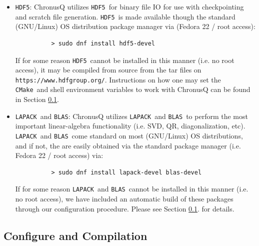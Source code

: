 \documentclass[12pt]{article}
\newcommand{\CMake}{\texttt{CMake}}
\newcommand{\HDF}{\texttt{HDF5}}
\newcommand{\LAPACK}{\texttt{LAPACK}}
\newcommand{\BLAS}{\texttt{BLAS}}
\newcommand{\Python}{\texttt{Python}}
\begin{document}
\begin{itemize}
	\begin{lstlisting}
          > sudo dnf install python-devel libxml2-devel libxslt-devel
	\end{lstlisting}
        To parse the input file, ChrounusQ relies on the \Python~module 
	\texttt{ConfigParser}. One may obtain \texttt{ConfigParser} through
	the \Python~\texttt{pip} module via:
	 
	\begin{lstlisting}
	  > pip install configparser
	\end{lstlisting}

      \item \HDF: ChronusQ utilizes \HDF~for binary file IO for use with 
        checkpointing and scratch file generation. \HDF~is made available
	though the standard (GNU/Linux) OS distribution package manager via
	(Fedora 22 / root access):

	\begin{lstlisting}
          > sudo dnf install hdf5-devel
	\end{lstlisting}
	If for some reason \HDF~cannot be installed in this manner (i.e. no
	root access), it may be compiled from source from the tar files on
	\texttt{https://www.hdfgroup.org/}. Instructions on how one may set
	the \CMake~and shell environment variables to work with ChronusQ
	can be found in Section \ref{subsec:ChronusQConfigCompile}.

      \item \LAPACK~and \BLAS: ChronusQ utilizes \LAPACK~and \BLAS~to perform
        the most important linear-algebra functionality (i.e. SVD, QR, 
	diagonalization, etc). \LAPACK~and \BLAS~come standard on most
	(GNU/Linux) OS distributions, and if not, the are easily obtained via
	the standard package manager (i.e. Fedora 22 / root access) via:

	\begin{lstlisting}
          > sudo dnf install lapack-devel blas-devel
	\end{lstlisting}
	If for some reason \LAPACK~and \BLAS~cannot be installed in this manner 
	(i.e. no root access), we have included an automatic build of these packages
	through our configuration procedure. Please see Section 
	\ref{subsec:ChronusQConfigCompile}. for details.

    \end{itemize}

    \subsection{Configure and Compilation} \label{subsec:ChronusQConfigCompile}
\end{document}
